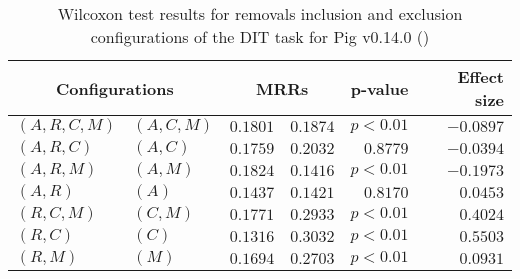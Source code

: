 
\begin{table}
\begin{spacing}{1.2}
\centering
\caption{Wilcoxon test results for removals inclusion and exclusion configurations of the DIT task for Pig v0.14.0 (\ctwo)}
\label{table:versus-wilcox-pig-dit-removals}
\begin{tabular}{ll|rr|rr}
\toprule
      \multicolumn{2}{c|}{Configurations} &                \multicolumn{2}{c|}{MRRs} &             p-value & Effect size \\
\midrule
 $(A,R,C,M)$ &  $(A,C,M)$ &       $0.1801$ &  $\bm{0.1874}$ & $p<0.01$ &   $-0.0897$ \\
   $(A,R,C)$ &    $(A,C)$ &       $0.1759$ &  $\bm{0.2032}$ & $0.8779$ &   $-0.0394$ \\
   $(A,R,M)$ &    $(A,M)$ &  $\bm{0.1824}$ &       $0.1416$ & $p<0.01$ &   $-0.1973$ \\
     $(A,R)$ &      $(A)$ &  $\bm{0.1437}$ &       $0.1421$ & $0.8170$ &    $0.0453$ \\
   $(R,C,M)$ &    $(C,M)$ &       $0.1771$ &  $\bm{0.2933}$ & $p<0.01$ &    $0.4024$ \\
     $(R,C)$ &      $(C)$ &       $0.1316$ &  $\bm{0.3032}$ & $p<0.01$ &    $0.5503$ \\
     $(R,M)$ &      $(M)$ &       $0.1694$ &  $\bm{0.2703}$ & $p<0.01$ &    $0.0931$ \\
\bottomrule
\end{tabular}

\end{spacing}
\end{table}

